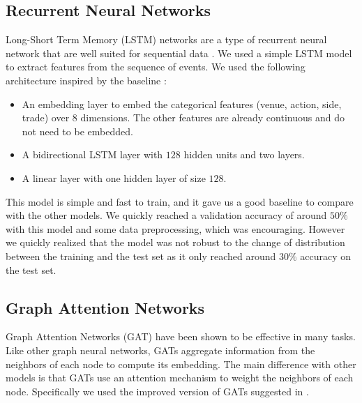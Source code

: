 \documentclass[switch, 11pt]{article}
\begin{document}
\begin{multicols}{2}
    \subsection{Recurrent Neural Networks}

    Long-Short Term Memory (LSTM) networks are a type of recurrent neural network that are well suited for sequential data \cite{hochreiter-1997}. We used a simple LSTM model to extract features from the sequence of events. We used the following architecture inspired by the baseline :
    \begin{itemize}
        \item An embedding layer to embed the categorical features (venue, action, side, trade) over $8$ dimensions. The other features are already continuous and do not need to be embedded.
        \item A bidirectional LSTM layer with $128$ hidden units and two layers.
        \item A linear layer with one hidden layer of size $128$.
    \end{itemize}

    This model is simple and fast to train, and it gave us a good baseline to compare with the other models. We quickly reached a validation accuracy of around $50\%$ with this model and some data preprocessing, which was encouraging. However we quickly realized that the model was not robust to the change of distribution between the training and the test set as it only reached around $30\%$ accuracy on the test set.

    \subsection{Graph Attention Networks}

    Graph Attention Networks (GAT) \cite{velickovic-2018} have been shown to be effective in many tasks. Like other graph neural networks, GATs aggregate information from the neighbors of each node to compute its embedding. The main difference with other models is that GATs use an attention mechanism to weight the neighbors of each node. Specifically we used the improved version of GATs suggested in \cite{brody-2021}.


\end{multicols}
\end{document}
